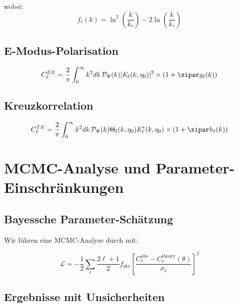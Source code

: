 	wobei:
	\begin{equation}
		f_\ell(k) = \ln^2\left(\frac{k}{k_*}\right) - 2\ln\left(\frac{k}{k_*}\right)
	\end{equation}
	
	\subsection{E-Modus-Polarisation}
	
	\begin{equation}
		C_\ell^{EE} = \frac{2}{\pi}\int_0^\infty k^2 dk \, \mathcal{P}_\Psi(k) |E_\ell(k,\eta_0)|^2 \times \left(1 + \xipar g_\ell(k)\right)
	\end{equation}
	
	\subsection{Kreuzkorrelation}
	
	\begin{equation}
		C_\ell^{TE} = \frac{2}{\pi}\int_0^\infty k^2 dk \, \mathcal{P}_\Psi(k) \Theta_\ell(k,\eta_0) E_\ell^*(k,\eta_0) \times \left(1 + \xipar h_\ell(k)\right)
	\end{equation}
	
	\section{MCMC-Analyse und Parameter-Einschränkungen}
	\label{sec:mcmc}
	
	\subsection{Bayessche Parameter-Schätzung}
	
	Wir führen eine MCMC-Analyse durch mit:
	
	\begin{equation}
		\mathcal{L} = -\frac{1}{2}\sum_{\ell} \frac{2\ell+1}{2} f_{\text{sky}} \left[\frac{C_\ell^{\text{obs}} - C_\ell^{\text{theory}}(\theta)}{\sigma_\ell}\right]^2
	\end{equation}
	
	\subsection{Ergebnisse mit Unsicherheiten}
	
